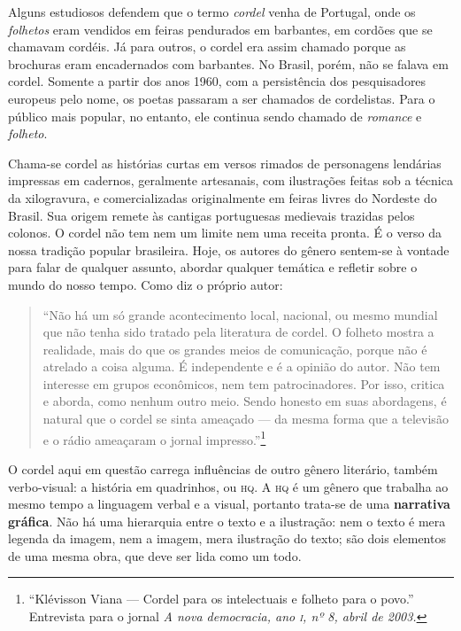 \documentclass[11pt]{extarticle}
\begin{document}
Alguns estudiosos defendem que o termo \textit{cordel} venha de Portugal, onde os \textit{folhetos} 
eram vendidos em feiras pendurados em barbantes, em cordões que se chamavam cordéis. Já para
outros, o cordel era assim chamado porque as brochuras eram encadernados com barbantes. 
No Brasil, porém, não se falava em cordel. Somente a partir dos anos 1960, com a persistência 
dos pesquisadores europeus pelo nome, os poetas passaram a ser chamados de 
cordelistas. Para o público mais popular, no entanto, ele continua sendo chamado de \textit{romance} e 
\textit{folheto}.

Chama-se cordel as histórias curtas em versos rimados de personagens 
lendárias impressas em cadernos, geralmente artesanais, com ilustrações feitas sob a técnica da 
xilogravura, e comercializadas originalmente em feiras livres do Nordeste do Brasil. 
Sua origem remete às cantigas portuguesas medievais trazidas pelos colonos.
O cordel não tem nem um limite nem uma receita pronta. É o verso da 
nossa tradição popular brasileira. Hoje, os autores do gênero sentem-se à vontade para falar de qualquer 
assunto, abordar qualquer temática e refletir sobre o mundo do nosso tempo. Como diz o próprio
autor: 

\begin{quote}
``Não há um só grande acontecimento local, nacional, ou mesmo mundial que não tenha sido tratado 
pela literatura de cordel. O folheto mostra a realidade, mais do que os grandes meios de comunicação, 
porque não é atrelado a coisa alguma. É independente e é a opinião do autor. Não tem interesse em 
grupos econômicos, nem tem patrocinadores. Por isso, critica e aborda, como nenhum outro meio. 
Sendo honesto em suas abordagens, é natural que o cordel se sinta ameaçado --- da mesma forma que 
a televisão e o rádio ameaçaram o jornal impresso.''\footnote{``Klévisson Viana --- Cordel para os intelectuais e folheto para o povo.'' Entrevista para o jornal \textit{A nova democracia, ano \textsc{i}, nº 8, abril de 2003.}}
\end{quote}

O cordel aqui em questão carrega influências de outro gênero literário, também
verbo-visual: a história em quadrinhos, ou \textsc{hq}. A \textsc{hq} é um 
gênero que trabalha ao mesmo tempo a linguagem verbal e a visual, portanto trata-se de 
uma \textbf{narrativa gráfica}. Não há uma hierarquia entre o texto e a ilustração: nem 
o texto é mera legenda da imagem, nem a imagem, mera ilustração do texto; são dois elementos 
de uma mesma obra, que deve ser lida como um todo.
\end{document}
